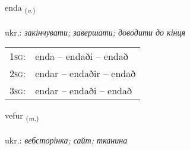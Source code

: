 \documentclass[frontgrid, backgrid]{flacards}\usepackage[]{graphicx}\usepackage[]{xcolor}
\begin{document}
\renewcommand{\flhead}{\vskip5pt \fboxsep=0pt {\small\bfseries\footnotesize Sagnorð | дієслово}}
\renewcommand{\fcfoot}{\vskip5pt \fboxsep=0pt \hspace{2pt}{\small\bfseries\footnotesize 1K}}

\renewcommand{\blhead}{\vskip5pt {\small\bfseries\footnotesize Sagnorð | дієслово }}
\renewcommand{\bcfoot}{\vskip5pt \hspace{2pt}{\small\bfseries\footnotesize 1K}}


{enda \small{\textsubscript{(\textit{v.})}} \\[1ex] %
\textphonetic{[ɛnta]} \\
ukr.: \emph{закінчувати; завершати; доводити до кінця} \\  [2ex]
\renewcommand*{\arraystretch}{0.8}
\begin{tabular}{p{1cm}l}
\textsc{1sg}: & enda -- endaði -- endað \\ 
\textsc{2sg}: & endar -- endaðir -- endað \\ 
\textsc{3sg}: & endar -- endaði -- endað \\ 
\end{tabular}
}

\renewcommand{\flhead}{\vskip5pt \fboxsep=0pt {\small\bfseries\footnotesize Nafnorð | іменник}}
\renewcommand{\fcfoot}{\vskip5pt \fboxsep=0pt \hspace{2pt}{\small\bfseries\footnotesize 1K}}

\renewcommand{\blhead}{\vskip5pt {\small\bfseries\footnotesize Nafnorð | іменник }}
\renewcommand{\bcfoot}{\vskip5pt \hspace{2pt}{\small\bfseries\footnotesize 1K}}


{vefur \small{\textsubscript{(\textit{m.})}} \\[1ex] %
\textphonetic{[vɛːvʏr]} \\
ukr.: \emph{вебсторінка; сайт; тканина} \\  [2ex]
\renewcommand*{\arraystretch}{0.8}
}
\end{document}
